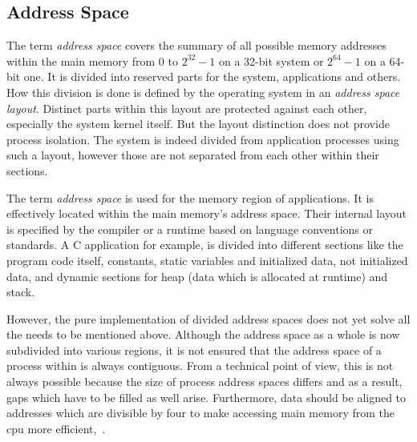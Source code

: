 \subsection{Address Space}
The term \textit{address space} covers the summary of all possible memory addresses within the main memory from 0 to $2^{32}-1$ on a 32-bit system or $2^{64}-1$ on a 64-bit one. 
It is divided into reserved parts for the system, applications and others.
How this division is done is defined by the operating system in an \textit{address space layout}\cite{mandl2014Grundkurs}.
Distinct parts within this layout are protected against each other, especially the system kernel itself\cite{brause2017betriebssysteme}.
But the layout distinction does not provide process isolation. 
The system is indeed divided from application processes using such a layout, however those are not separated from each other within their sections\cite{mandl2014Grundkurs}.

The term \textit{address space} is used for the memory region of applications.
It is effectively located within the main memory's address space.
Their internal layout is specified by the compiler or a runtime based on language conventions or standards.
A C application for example, is divided into different sections like the program code itself, constants, static variables and initialized data, not initialized data, and dynamic sections for heap (data which is allocated at runtime) and stack\cite{mandl2014Grundkurs}.

However, the pure implementation of divided address spaces does not yet solve all the needs to be mentioned above.
Although the address space as a whole is now subdivided into various regions, it is not ensured that the address space of a process within is always contiguous.
From a technical point of view, this is not always possible because the size of process address spaces differs and as a result, gaps which have to be filled as well arise\cite{mandl2014Grundkurs}.
Furthermore, data should be aligned to addresses which are divisible by four to make accessing main memory from the \ac{cpu} more efficient\cite{mandl2014Grundkurs},~\cite{brause2017betriebssysteme}.
%
%
 
